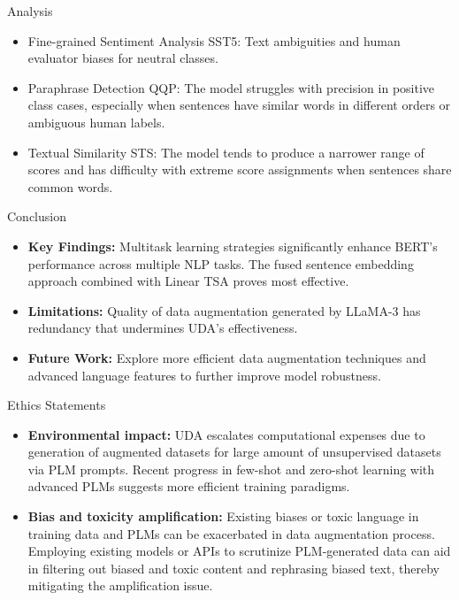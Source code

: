 \documentclass[final]{beamer}
\newlength{\colwidth}
\begin{document}
\begin{frame}[t]
\begin{columns}[t]
\begin{column}{\colwidth}
\begin{block}{Analysis}
\begin{itemize}
        \item Fine-grained Sentiment Analysis SST5: Text ambiguities and human evaluator biases for neutral classes.
        \item Paraphrase Detection QQP: The model struggles with precision in positive class cases, especially when sentences have similar words in different orders or ambiguous human labels.
        \item Textual Similarity STS: The model tends to produce a narrower range of scores and has difficulty with extreme score assignments when sentences share common words.
    \end{itemize}
  \end{block}

  \begin{block}{Conclusion}
    \begin{itemize}
        \item \textbf{Key Findings:} Multitask learning strategies significantly enhance BERT’s performance across multiple NLP tasks. The fused sentence embedding approach combined with Linear TSA proves most effective.
        \item \textbf{Limitations:} Quality of data augmentation generated by LLaMA-3 has redundancy that undermines UDA's effectiveness.
        \item \textbf{Future Work:} Explore more efficient data augmentation techniques and advanced language features to further improve model robustness.
    \end{itemize}
  \end{block}

  \begin{block}{Ethics Statements}
    \begin{itemize}
        \item \textbf{Environmental impact:} UDA escalates 
        computational expenses due to generation of augmented datasets for large amount of unsupervised datasets via PLM prompts. Recent progress in few-shot and zero-shot learning with advanced PLMs suggests more efficient training paradigms.
        \item \textbf{Bias and toxicity amplification:} Existing biases or toxic language in training data and PLMs can be exacerbated in data augmentation 
        process. Employing existing models or APIs to scrutinize PLM-generated data can aid in filtering out 
        biased and toxic content and rephrasing biased text, thereby mitigating the amplification issue.
    \end{itemize} 
      

\end{block}
\end{column}
\end{columns}
\end{frame}
\end{document}
